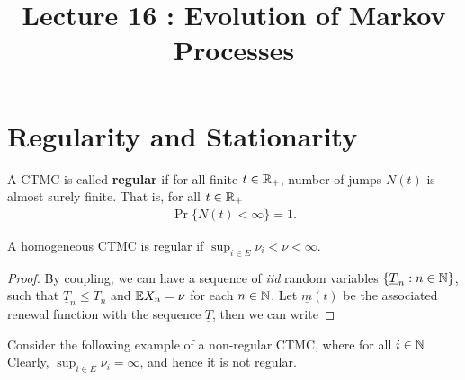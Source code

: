 \documentclass[a4paper,10pt,english]{article}
\title{Lecture 16 : Evolution of Markov Processes}
\author{}
\begin{document}
\maketitle

\section{Regularity and Stationarity}
A CTMC is called \textbf{regular} if for all finite $t \in \mathbb{R}_+$, number of jumps $N(t)$ is almost surely finite. 
That is, for all $t \in \mathbb{R}_+$
\begin{align*}
\Pr\{ N(t) < \infty \} = 1.
\end{align*} 
\begin{lem} 
A homogeneous CTMC is regular if $\sup_{i \in E} \nu_i < \nu < \infty$. 
\end{lem}
\begin{proof}
By coupling, we can have a sequence of \textit{iid} random variables $\{\underline{T}_n: n \in \mathbb{N}\}$, 
such that $\underline{T}_n \leq T_n$ and $\mathbb{E} X_n = \nu$ for each $n \in \mathbb{N}$. 
Let $\underline{m}(t)$ be the associated renewal function with the sequence $\underline{T}$, 
then we can write 
\end{proof}
\begin{shaded*}
Consider the following example of a non-regular CTMC, where for all $i \in \mathbb{N}$
Clearly, $\sup_{i \in E}\nu_i = \infty$, and hence it is not regular.
\end{shaded*}
\end{document}
